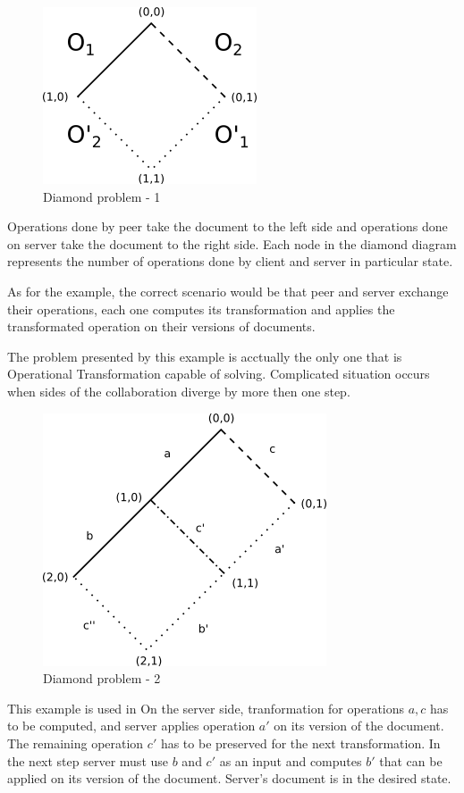 \documentclass[12pt,oneside]{fithesis2}
\begin{document}
\begin{figure}[H]
\caption{Diamond problem - 1}
\label{fig:diamond1}
\centering
\vspace{5mm}
\includegraphics{diamond}
\end{figure}
Operations done by peer take the document to the left side and operations done on server take the document to the right side. Each node in the diamond diagram represents the number of operations done by client and server in particular state. 
\par As for the example, the correct scenario would be that peer and server exchange their operations, each one computes its transformation and applies the transformated operation on their versions of documents.
\par The problem presented by this example is acctually the only one that is Operational Transformation capable of solving. Complicated situation occurs when sides of the collaboration diverge by more then one step. 
\begin{figure}[H]
\caption{Diamond problem - 2}
\label{fig:diamond2}
\centering
\vspace{5mm}
\includegraphics{diamond1}
\end{figure}
This example is used in \cite{Spiewak} On the server side, tranformation for operations \(a,c\) has to be computed, and server applies operation \(a'\) on its version of the document. The remaining operation \(c'\) has to be preserved for the next transformation. In the next step server must use \(b\) and \(c'\) as an input and computes \(b'\) that can be applied on its version of the document. Server's document is in the desired state. 
\end{document}
